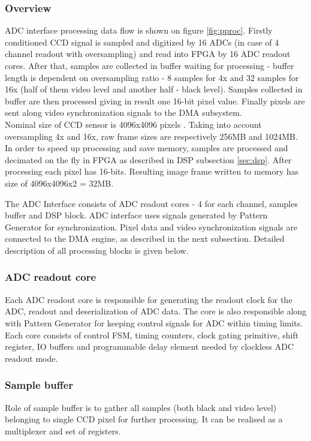 \subsubsection{Overview}
ADC interface processing data flow is shown on figure \ref{fig:pproc}. Firstly conditioned CCD signal is sampled and digitized by 16 ADCs (in case of 4 channel readout with oversampling) and read into FPGA by 16 ADC readout cores. After that, samples are collected in buffer waiting for processing - buffer length is dependent on oversampling ratio - 8 samples for 4x and 32 samples for 16x (half of them video level and another half - black level). Samples collected in buffer are then processed giving in result one 16-bit pixel value. Finally pixels are sent along video synchronization signals to the DMA subsystem. \\
Nominal size of CCD sensor is 4096x4096 pixels . Taking into account oversampling 4x and 16x, raw frame sizes are respectively 256MB and 1024MB. In order to speed up processing and save memory, samples are processed and decimated on the fly in FPGA as described in DSP subsection \ref{sec:dsp}. After processing each pixel has 16-bits. Resulting image frame written to memory has size of 4096x4096x2 = 32MB. 

The ADC Interface consists of ADC readout cores - 4 for each channel, samples buffer and DSP block. ADC interface uses signals generated by Pattern Generator for synchronization. Pixel data and video synchronization signals are connected to the DMA engine, as described in the next subsection. Detailed description of all processing blocks is given below.

\subsubsection{ADC readout core}
Each ADC readout core is responsible for generating the readout clock for the ADC, readout and deserialization of ADC data. The core is also responsible along with Pattern Generator for keeping control signals for ADC within timing limits. Each core consists of control FSM, timing counters, clock gating primitive, shift register, IO buffers and programmable delay element needed by clockless ADC readout mode.

\subsubsection{Sample buffer}
Role of sample buffer is to gather all samples (both black and video level) belonging to single CCD pixel for further processing. It can be realised as a multiplexer and set of registers. 

